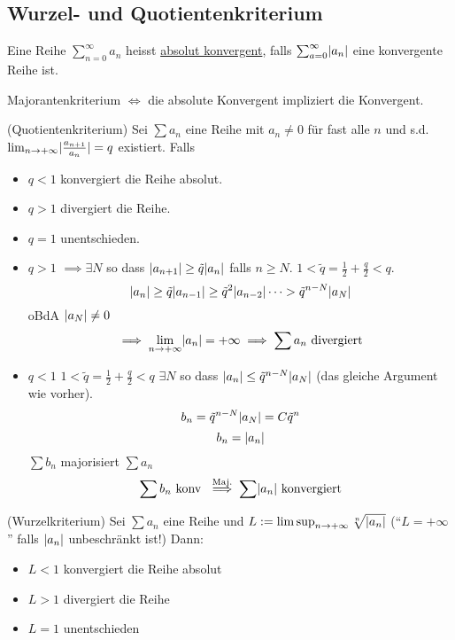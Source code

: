 \subsection{Wurzel- und Quotientenkriterium}
\begin{Def}
  Eine Reihe $\sum^\infty_{n=0} a_n$ heisst \ul{absolut konvergent}, falls $\sum_{a=0}^\infty \mathopen| a_n \mathclose|$ eine konvergente Reihe ist.
\end{Def}
\begin{Bem}
  Majorantenkriterium $\iff$ die absolute Konvergent impliziert die Konvergent.
\end{Bem}
\begin{Sat} (Quotientenkriterium)
  Sei $\sum a_n$ eine Reihe mit $a_n\neq 0$ für fast alle $n$ und s.d. $\lim_{n\to+\infty}\mathopen| \frac{a_{n+1}}{a_n} \mathclose|=q$ existiert. Falls
  \begin{itemize}
    \item $q<1$ konvergiert die Reihe absolut.
    \item $q>1$ divergiert die Reihe.
    \item $q=1$ unentschieden.
  \end{itemize}
\end{Sat}
\begin{Bew}
  \begin{itemize}
    \item $q>1$ $\implies \exists N$ so dass $\mathopen| a_{n+1} \mathclose|\geq \tilde q\mathopen| a_n \mathclose|$ falls $n\geq N$. $1<\tilde q=\frac{1}{2}+\frac{q}{2}<q$.
      \[\mathopen| a_n \mathclose|\geq \tilde q\mathopen| a_{n-1} \mathclose|\geq \tilde{q}^2\mathopen| a_{n-2} \mathclose|\cdots>\tilde{q}^{n-N}\mathopen| a_N \mathclose|\]
      oBdA $\mathopen| a_N \mathclose|\neq 0$
      \[\implies \lim_{n\to+\infty}\mathopen| a_n \mathclose|=+\infty\implies\sum a_n\text{ divergiert}\]
    \item $q<1$ $1<\tilde q=\frac{1}{2}+\frac{q}{2}<q$ $\exists N$ so dass $\mathopen| a_n \mathclose|\leq \tilde{q}^{n-N}\mathopen| a_N \mathclose|$ (das gleiche Argument wie vorher).
      \[b_n=\tilde{q}^{n-N}\mathopen| a_N \mathclose|=C\tilde{q}^n\]
      \[b_n=\mathopen| a_n \mathclose|\]
      $\sum b_n$ majorisiert $\sum a_n$
      \[\sum b_n \text{ konv }\stackrel{\text{Maj.}}{\implies}\sum\mathopen| a_n \mathclose| \text{ konvergiert}\]
  \end{itemize}
\end{Bew}
\begin{Sat} (Wurzelkriterium)
  Sei $\sum a_n$ eine Reihe und $L:=\limsup_{n\to+\infty}\sqrt[n]{\mathopen| a_n \mathclose|}$ (``$L=+\infty$'' falls $\mathopen| a_n \mathclose|$ unbeschränkt ist!) Dann:
  \begin{itemize}
    \item $L<1$ konvergiert die Reihe absolut
    \item $L>1$ divergiert die Reihe
    \item $L=1$ unentschieden
  \end{itemize}
\end{Sat}
